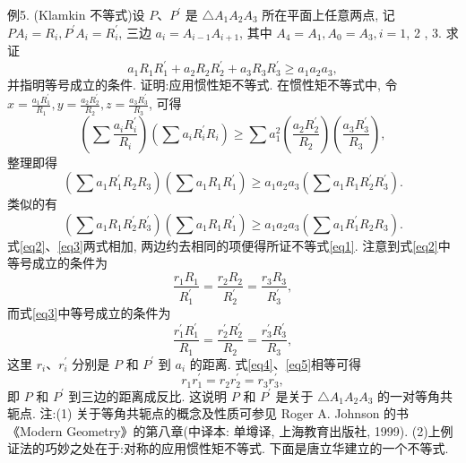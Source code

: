 例5. (Klamkin 不等式)设 $P 、 P^{\prime}$ 是 $\triangle A_1 A_2 A_3$ 所在平面上任意两点, 记 $P A_i=R_i, P^{\prime} A_i=R_i^{\prime}$, 三边 $a_i=A_{i-1} A_{i+1}$, 其中 $A_4=A_1, A_0=A_3, i=1$, 2 , 3. 求证
$$
a_1 R_1 R_1^{\prime}+a_2 R_2 R_2^{\prime}+a_3 R_3 R_3^{\prime} \geqslant a_1 a_2 a_3, \label{eq1}
$$
并指明等号成立的条件.
证明:应用惯性矩不等式.
在惯性矩不等式中, 令 $x=\frac{a_1 R_1^{\prime}}{R_1}, y=\frac{a_2 R_2^{\prime}}{R_2}, z=\frac{a_3 R_3^{\prime}}{R_3}$, 可得
$$
\left(\sum \frac{a_i R_i^{\prime}}{R_i}\right)\left(\sum a_i R_i^{\prime} R_i\right) \geqslant \sum a_1^2\left(\frac{a_2 R_2^{\prime}}{R_2}\right)\left(\frac{a_3 R_3^{\prime}}{R_3}\right),
$$
整理即得
$$
\left(\sum a_1 R_1^{\prime} R_2 R_3\right)\left(\sum a_1 R_1 R_1^{\prime}\right) \geqslant a_1 a_2 a_3\left(\sum a_1 R_1 R_2^{\prime} R_3^{\prime}\right) . \label{eq2}
$$
类似的有
$$
\left(\sum a_1 R_1 R_2^{\prime} R_3^{\prime}\right)\left(\sum a_1 R_1 R_1^{\prime}\right) \geqslant a_1 a_2 a_3\left(\sum a_1 R_1^{\prime} R_2 R_3\right) .  \label{eq3}
$$
式\ref{eq2}、\ref{eq3}两式相加, 两边约去相同的项便得所证不等式\ref{eq1}.
注意到式\ref{eq2}中等号成立的条件为
$$
\frac{r_1 R_1}{R_1^{\prime}}=\frac{r_2 R_2}{R_2^{\prime}}=\frac{r_3 R_3}{R_3^{\prime}}, \label{eq4}
$$
而式\ref{eq3}中等号成立的条件为
$$
\frac{r_1^{\prime} R_1^{\prime}}{R_1}=\frac{r_2^{\prime} R_2^{\prime}}{R_2}=\frac{r_3^{\prime} R_3^{\prime}}{R_3}, \label{eq5}
$$
这里 $r_i 、 r_i^{\prime}$ 分别是 $P$ 和 $P^{\prime}$ 到 $a_i$ 的距离.
式\ref{eq4}、\ref{eq5}相等可得
$$
r_1 r_1^{\prime}=r_2 r_2^{\prime}=r_3 r_3^{\prime},
$$
即 $P$ 和 $P^{\prime}$ 到三边的距离成反比.
这说明 $P$ 和 $P^{\prime}$ 是关于 $\triangle A_1 A_2 A_3$ 的一对等角共轭点.
注:(1) 关于等角共轭点的概念及性质可参见 Roger A. Johnson 的书 《Modern Geometry》的第八章(中译本: 单墫译, 上海教育出版社, 1999).
(2)上例证法的巧妙之处在于:对称的应用惯性矩不等式.
下面是唐立华建立的一个不等式.



